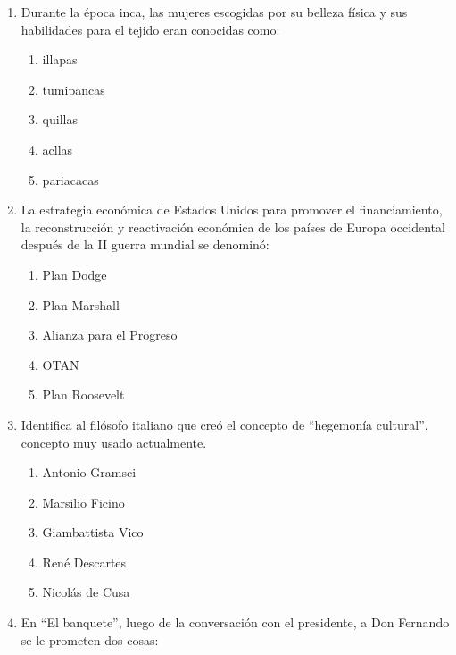 \begin{enumerate}
	Son ciertas:
	\begin{enumerate}[label=\alph*)]
		\item 1, 2 y 3
		\item 1, 2 y 4
		\item 1, 2 y 5
		\item 2, 3 y 4
		\item 3 y 5
	\end{enumerate}

	\item Durante la época inca, las mujeres escogidas por su belleza física y sus habilidades para el tejido eran conocidas como:
	\begin{enumerate}[label=\alph*)]
		\item illapas
		\item tumipancas
		\item quillas
		\item acllas
		\item pariacacas
	\end{enumerate}

	\item La estrategia económica de Estados Unidos para promover el financiamiento, la reconstrucción y reactivación económica de los países de Europa occidental después de la II guerra mundial se denominó:
	\begin{enumerate}[label=\alph*)]
		\item Plan Dodge
		\item Plan Marshall
		\item Alianza para el Progreso
		\item OTAN
		\item Plan Roosevelt
	\end{enumerate}




	\item Identifica al filósofo italiano que creó el concepto de ``hegemonía cultural'', concepto muy usado actualmente.
	\begin{enumerate}[label=\alph*)]
		\item Antonio Gramsci
		\item Marsilio Ficino
		\item Giambattista Vico
		\item René Descartes
		\item Nicolás de Cusa
	\end{enumerate}

	\item En ``El banquete'', luego de la conversación con el presidente, a Don Fernando se le prometen dos cosas:


\end{enumerate}
